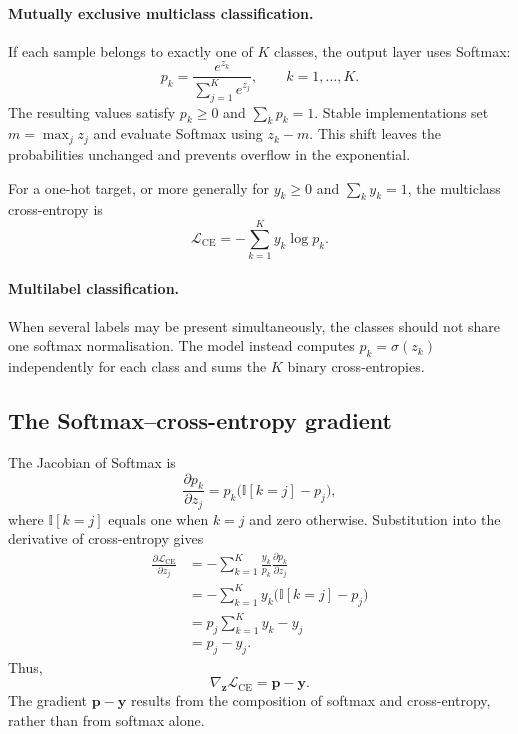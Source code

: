 \paragraph{Mutually exclusive multiclass classification.}
If each sample belongs to exactly one of \(K\) classes, the output layer uses Softmax:
\begin{equation}
    p_k
    =\frac{e^{z_k}}{\sum_{j=1}^{K}e^{z_j}},
    \qquad k=1,\ldots,K.
    \label{eq:softmax}
\end{equation}
The resulting values satisfy \(p_k\geq0\) and \(\sum_k p_k=1\). Stable implementations set \(m=\max_j z_j\) and evaluate Softmax using \(z_k-m\). This shift leaves the probabilities unchanged and prevents overflow in the exponential.

For a one-hot target, or more generally for \(y_k\geq0\) and \(\sum_k y_k=1\), the multiclass cross-entropy is
\begin{equation}
    \mathcal{L}_{\mathrm{CE}}
    =-\sum_{k=1}^{K}y_k\log p_k.
    \label{eq:cross-entropy}
\end{equation}

\paragraph{Multilabel classification.}
When several labels may be present simultaneously, the classes should not share one softmax normalisation. The model instead computes \(p_k=\sigma(z_k)\) independently for each class and sums the \(K\) binary cross-entropies.

\ActivationCouplingFigure

\subsection{The Softmax--cross-entropy gradient}

The Jacobian of Softmax is
\begin{equation}
    \frac{\partial p_k}{\partial z_j}
    =p_k\bigl(\mathbb{I}[k=j]-p_j\bigr),
    \label{eq:softmax-jacobian}
\end{equation}
where \(\mathbb{I}[k=j]\) equals one when \(k=j\) and zero otherwise. Substitution into the derivative of cross-entropy gives
\begin{align*}
    \frac{\partial\mathcal{L}_{\mathrm{CE}}}{\partial z_j}
    &=-\sum_{k=1}^{K}
      \frac{y_k}{p_k}
      \frac{\partial p_k}{\partial z_j}\\
    &=-\sum_{k=1}^{K}y_k
      \bigl(\mathbb{I}[k=j]-p_j\bigr)\\
    &=p_j\sum_{k=1}^{K}y_k-y_j\\
    &=p_j-y_j.
\end{align*}
Thus,
\begin{equation}
    \nabla_{\mathbf{z}}\mathcal{L}_{\mathrm{CE}}
    =\mathbf{p}-\mathbf{y}.
    \label{eq:softmax-ce-gradient}
\end{equation}
The gradient $\mathbf p-\mathbf y$ results from the composition of softmax and cross-entropy, rather than from softmax alone.

